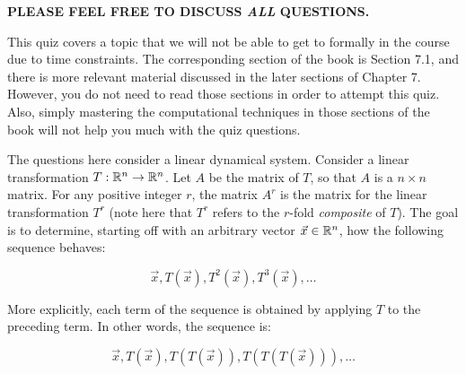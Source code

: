 \documentclass[10pt]{amsart}
\begin{document}
{\bf PLEASE FEEL FREE TO DISCUSS {\em ALL} QUESTIONS.}

This quiz covers a topic that we will not be able to get to formally
in the course due to time constraints. The corresponding section of
the book is Section 7.1, and there is more relevant material discussed
in the later sections of Chapter 7. However, you do not need to read
those sections in order to attempt this quiz. Also, simply mastering
the computational techniques in those sections of the book will not
help you much with the quiz questions.

The questions here consider a linear dynamical system. Consider a
linear transformation $T:\mathbb{R}^n \to \mathbb{R}^n$. Let $A$ be the matrix of $T$,
so that $A$ is a $n \times n$ matrix. For any positive integer $r$,
the matrix $A^r$ is the matrix for the linear transformation $T^r$
(note here that $T^r$ refers to the $r$-fold {\em composite} of
$T$). The goal is to determine, starting off with an arbitrary vector
$\vec{x} \in \mathbb{R}^n$, how the following sequence behaves:

$$\vec{x}, T(\vec{x}), T^2(\vec{x}), T^3(\vec{x}), \dots$$

More explicitly, each term of the sequence is obtained by applying $T$
to the preceding term. In other words, the sequence is:

$$\vec{x}, T(\vec{x}), T(T(\vec{x})), T(T(T(\vec{x}))), \dots$$
\end{document}
